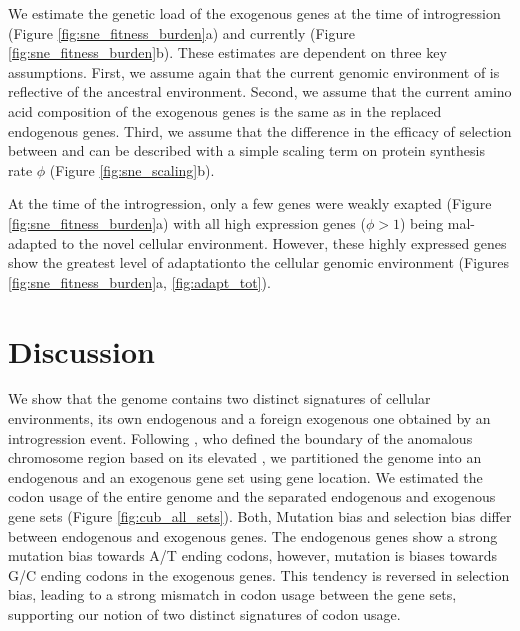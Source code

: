 \documentclass[12pt]{article}
\begin{document}
We estimate the genetic load of the exogenous genes at the time of introgression (Figure \ref{fig:sne_fitness_burden}a) and currently (Figure \ref{fig:sne_fitness_burden}b).
These estimates are dependent on three key assumptions.
First, we assume again that the current genomic environment of \gossypii is reflective of the ancestral environment.
Second, we assume that the current amino acid composition of the exogenous genes is the same as in the replaced endogenous genes.
Third, we assume that the difference in the efficacy of selection between \gossypii and \kluyveri can be described with a simple scaling term on protein synthesis rate $\phi$ (Figure \ref{fig:sne_scaling}b).

At the time of the introgression, only a few genes were weakly exapted (Figure \ref{fig:sne_fitness_burden}a) with all high expression genes ($\phi > 1$) being mal-adapted to the novel cellular environment.
However, these highly expressed genes show the greatest level of adaptationto the \kluyveri cellular genomic environment (Figures \ref{fig:sne_fitness_burden}a, \ref{fig:adapt_tot}).

\section*{Discussion}

We show that the \kluyveri genome contains two distinct signatures of cellular environments, its own endogenous and a foreign exogenous one obtained by an introgression event.
Following \citet{payen2009}, who defined the boundary of the anomalous chromosome region based on its elevated \GC, we partitioned the \kluyveri genome into an endogenous and an exogenous gene set using gene location.
We estimated the codon usage of the entire \kluyveri genome and the separated endogenous and exogenous gene sets (Figure \ref{fig:cub_all_sets}).
Both, Mutation bias and selection bias differ between endogenous and exogenous genes.
The endogenous genes show a strong mutation bias towards A/T ending codons, however, mutation is biases towards G/C ending codons in the exogenous genes.
This tendency is reversed in selection bias, leading to a strong mismatch in codon usage between the gene sets, supporting our notion of two distinct signatures of codon usage.
\end{document}
